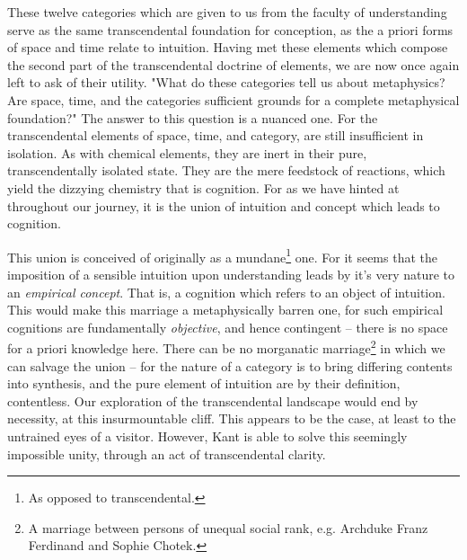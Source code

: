 

\noindent
These twelve categories which are given to us from the faculty of understanding serve as the same transcendental foundation for conception, as the a priori forms of space and time relate to intuition. Having met these elements which compose the second part of the transcendental doctrine of elements, we are now once again left to ask of their utility. "What do these categories tell us about metaphysics? Are space, time, and the categories sufficient grounds for a complete metaphysical foundation?" The answer to this question is a nuanced one. For the transcendental elements of space, time, and category, are still insufficient in isolation. As with chemical elements, they are inert in their pure, transcendentally isolated state. They are the mere feedstock of reactions, which yield the dizzying chemistry that is cognition. For as we have hinted at throughout our journey, it is the union of intuition and concept which leads to cognition.

This union is conceived of originally as a mundane\footnote{As opposed to transcendental.} one. For it seems that the imposition of a sensible intuition upon understanding leads by it's very nature to an \emph{empirical concept}. That is, a cognition which refers to an object of intuition. This would make this marriage a metaphysically barren one, for such empirical cognitions are fundamentally \emph{objective}, and hence contingent -- there is no space for a priori knowledge here. There can be no morganatic marriage\footnote{A marriage between persons of unequal social rank, e.g. Archduke Franz Ferdinand and Sophie Chotek.} in which we can salvage the union -- for the nature of a category is to bring differing contents into synthesis, and the pure element of intuition are by their definition, contentless. Our exploration of the transcendental landscape would end by necessity, at this insurmountable cliff. This appears to be the case, at least to the untrained eyes of a visitor. However, Kant is able to solve this seemingly impossible unity, through an act of transcendental clarity.


